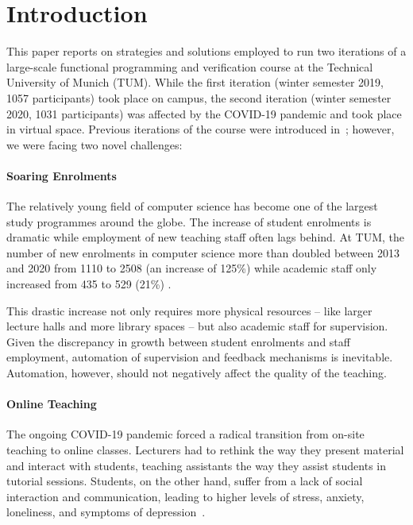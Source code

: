 \section{Introduction}

This paper reports on strategies and solutions employed to
run two iterations of a large-scale functional programming and verification course at the Technical University of Munich (TUM).
While the first iteration (winter semester 2019, 1057 participants)
took place on campus,
the second iteration (winter semester 2020, 1031 participants) was affected by the COVID-19 pandemic and took place in virtual space.
Previous iterations of the course were introduced in~\cite{next_1100};
however, we were facing two novel challenges:

\paragraph{Soaring Enrolments}
The relatively young field of computer science has
become one of the largest study programmes around the globe.
The increase of student enrolments is dramatic
\cite{comp_sci_growth1,comp_sci_growth2}
while employment of new teaching staff often lags behind.
At TUM, the number of new enrolments in computer science more than doubled between 2013 and 2020 from 1110 to 2508 (an increase of 125\%)
while academic staff only increased from 435 to 529 (21\%) \cite{tum_numbers}.

This drastic increase not only requires more physical resources -- like larger lecture halls and more library spaces --
but also academic staff for supervision.
Given the discrepancy in growth between student enrolments and staff employment,
automation of supervision and feedback mechanisms is inevitable.
Automation, however, should not
negatively affect the quality of the teaching.

\paragraph{Online Teaching}
The ongoing COVID-19 pandemic forced a radical
transition from on-site teaching to online classes.
Lecturers had to rethink the way they present material and interact with students,
teaching assistants the way they assist students in tutorial sessions.
Students, on the other hand, suffer from a lack of social interaction and communication, leading to higher
levels of stress, anxiety, loneliness, and symptoms of depression~\cite{students_lockdown1}.

